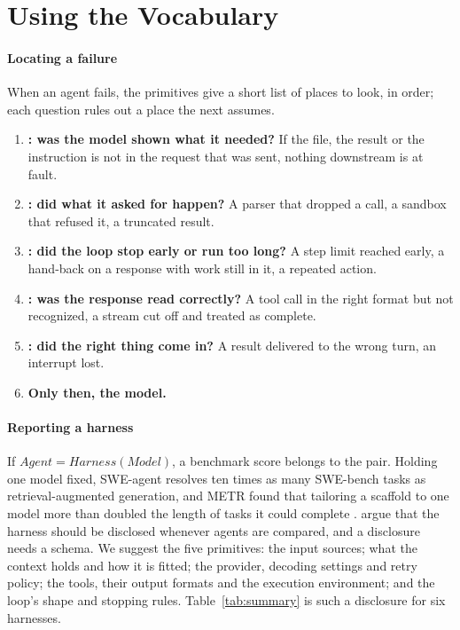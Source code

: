 \section{Using the Vocabulary}
\label{sec:uses}
\paragraph{Locating a failure} When an agent fails, the primitives give a short list of places to look, in order; each question rules out a place the next assumes.
\begin{enumerate}
  \item \textbf{: was the model shown what it needed?} If the file, the result or the instruction is not in the request that was sent, nothing downstream is at fault.
  \item \textbf{: did what it asked for happen?} A parser that dropped a call, a sandbox that refused it, a truncated result.
  \item \textbf{: did the loop stop early or run too long?} A step limit reached early, a hand-back on a response with work still in it, a repeated action.
  \item \textbf{: was the response read correctly?} A tool call in the right format but not recognized, a stream cut off and treated as complete.
  \item \textbf{: did the right thing come in?} A result delivered to the wrong turn, an interrupt lost.
  \item \textbf{Only then, the model.}
\end{enumerate}

\paragraph{Reporting a harness} If $\textit{Agent} = \textit{Harness}(\textit{Model})$, a benchmark score belongs to the pair. Holding one model fixed, SWE-agent \cite{yang2024sweagent} resolves ten times as many SWE-bench tasks as retrieval-augmented generation, and METR found that tailoring a scaffold to one model more than doubled the length of tasks it could complete \cite{metr2025update}. \cite{zhang2026stop} argue that the harness should be disclosed whenever agents are compared, and a disclosure needs a schema. We suggest the five primitives: the input sources; what the context holds and how it is fitted; the provider, decoding settings and retry policy; the tools, their output formats and the execution environment; and the loop's shape and stopping rules. Table~\ref{tab:summary} is such a disclosure for six harnesses.


